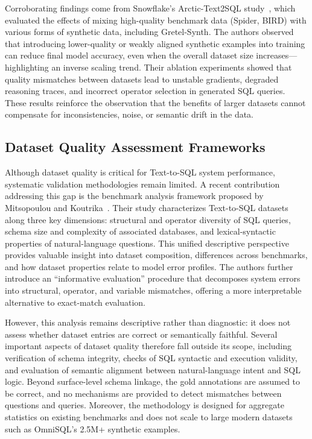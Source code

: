 \documentclass[print]{einformatica}
\begin{document}
Corroborating findings come from Snowflake's Arctic-Text2SQL study~\cite{yao2025arctic}, which evaluated the effects of mixing high-quality benchmark data (Spider, BIRD) with various forms of synthetic data, including Gretel-Synth. The authors observed that introducing lower-quality or weakly aligned synthetic examples into training can reduce final model accuracy, even when the overall dataset size increases---highlighting an inverse scaling trend. Their ablation experiments showed that quality mismatches between datasets lead to unstable gradients, degraded reasoning traces, and incorrect operator selection in generated SQL queries. These results reinforce the observation that the benefits of larger datasets cannot compensate for inconsistencies, noise, or semantic drift in the data.

\subsection{Dataset Quality Assessment Frameworks}\label{sec:dataset_quality}

Although dataset quality is critical for Text-to-SQL system performance, systematic validation methodologies remain limited. A recent contribution addressing this gap is the benchmark analysis framework proposed by Mitsopoulou and Koutrika~\cite{mitsopoulou2025analysis}. Their study characterizes Text-to-SQL datasets along three key dimensions: structural and operator diversity of SQL queries, schema size and complexity of associated databases, and lexical-syntactic properties of natural-language questions. This unified descriptive perspective provides valuable insight into dataset composition, differences across benchmarks, and how dataset properties relate to model error profiles. The authors further introduce an ``informative evaluation'' procedure that decomposes system errors into structural, operator, and variable mismatches, offering a more interpretable alternative to exact-match evaluation.

However, this analysis remains descriptive rather than diagnostic: it does not assess whether dataset entries are correct or semantically faithful. Several important aspects of dataset quality therefore fall outside its scope, including verification of schema integrity, checks of SQL syntactic and execution validity, and evaluation of semantic alignment between natural-language intent and SQL logic. Beyond surface-level schema linkage, the gold annotations are assumed to be correct, and no mechanisms are provided to detect mismatches between questions and queries. Moreover, the methodology is designed for aggregate statistics on existing benchmarks and does not scale to large modern datasets such as OmniSQL's 2.5M+ synthetic examples.
\end{document}
